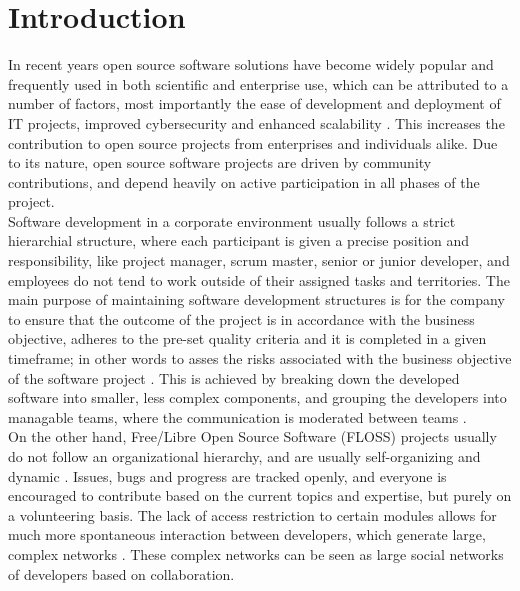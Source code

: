 \thepage
\section{Introduction}


In recent years open source software solutions have become widely popular and frequently used in both scientific and enterprise use, which can be attributed to a number of factors, most importantly the ease of development and deployment of IT projects, improved cybersecurity and enhanced scalability \cite{pwcLeadingBenefitsOpensource2016}. This increases the contribution to open source projects from enterprises and individuals alike. Due to its nature, open source software projects are driven by community contributions, and depend heavily on active participation in all phases of the project. \\

Software development in a corporate environment usually follows a strict hierarchial structure, where each participant is given a precise position and responsibility, like project manager, scrum master, senior or junior developer, and employees do not tend to work outside of their assigned tasks and territories. The main purpose of maintaining software development structures is for the company to ensure that the outcome of the project is in accordance with the business objective, adheres to the pre-set quality criteria and it is completed in a given timeframe; in other words to asses the risks associated with the business objective of the software project \cite{surekaUsingSocialNetwork2011}. This is achieved by breaking down the developed software into smaller, less complex components, and grouping the developers into managable teams, where the communication is moderated between teams \cite{birdLatentSocialStructure2008}. \\

On the other hand, Free/Libre Open Source Software (FLOSS) projects usually do not follow an organizational hierarchy, and are usually self-organizing and dynamic \cite{birdLatentSocialStructure2008}. Issues, bugs and progress are tracked openly, and everyone is encouraged to contribute based on the current topics and expertise, but purely on a volunteering basis. The lack of access restriction to certain modules allows for much more spontaneous interaction between developers, which generate large, complex networks \cite{martinez-romoUsingSocialNetwork2008}. These complex networks can be seen as large social networks of developers based on collaboration. \\

